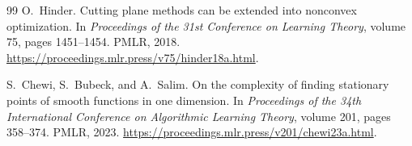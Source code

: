 \documentclass[11pt]{article}
\numberwithin{equation}{section}
\theoremstyle{definition}
\theoremstyle{remark}
\begin{document}
\begin{thebibliography}{99}
O.~Hinder.
\newblock Cutting plane methods can be extended into nonconvex optimization.
\newblock In \emph{Proceedings of the 31st Conference on Learning Theory}, volume 75, pages 1451--1454. PMLR, 2018.
\newblock \url{https://proceedings.mlr.press/v75/hinder18a.html}.

S.~Chewi, S.~Bubeck, and A.~Salim.
\newblock On the complexity of finding stationary points of smooth functions in one dimension.
\newblock In \emph{Proceedings of the 34th International Conference on Algorithmic Learning Theory}, volume 201, pages 358--374. PMLR, 2023.
\newblock \url{https://proceedings.mlr.press/v201/chewi23a.html}.

\end{thebibliography}
\end{document}
